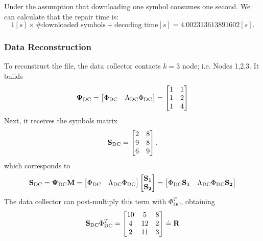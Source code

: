 \documentclass{article}
\begin{document}
Under the assumption that downloading one symbol consumes one second. We can calculate that the repair time is:
\begin{equation*}
1[s] \times \text{\#downloaded symbols} + \text{decoding time}[s] = 4.002313613891602 [s].
\end{equation*}

\subsubsection{Data Reconstruction}
To reconstruct the file, the data collector contacts $k=3$ node; i.e. Nodes 1,2,3. It builds 
\begin{equation*}
\vb{\Psi}_{\text{DC}} =
\begin{bmatrix}
\Phi_{\text{DC}} & \Lambda_{\text{DC}}\Phi_{\text{DC}} \\
\end{bmatrix} =  
\begin{bmatrix}
1 & 1 \\
1 & 2 \\
1 & 4
\end{bmatrix}
\end{equation*}
Next, it receives the symbols matrix
\begin{equation*}
\vb{S}_{\text{DC}} =
\begin{bmatrix}
2 & 8 \\
9 & 8 \\
6 & 9 
\end{bmatrix}.
\end{equation*}
which corresponds to 
\begin{equation*}
\vb{S}_{\text{DC}} = \vb{\Psi}_{\text{DC}}\vb{M} =
\begin{bmatrix}
\Phi_{\text{DC}} & \Lambda_{\text{DC}}\Phi_{\text{DC}} \\
\end{bmatrix}
\begin{bmatrix}
\vb{S_1} \\
\vb{S_2}
\end{bmatrix} =
\begin{bmatrix}
\Phi_{\text{DC}}\vb{S_1} & \Lambda_{\text{DC}}\Phi_{\text{DC}}\vb{S_2} \\
\end{bmatrix}
\end{equation*}
The data collector can post-multiply this term with $\Phi_{\text{DC}}^T$, obtaining
\begin{equation*}
\vb{S}_{\text{DC}} \Phi_{\text{DC}}^T =
\begin{bmatrix}
10 & 5 & 8 \\
4 & 12 & 2 \\
2 & 11 & 3 
\end{bmatrix}
\doteq 
\vb{R}
\end{equation*}
\end{document}
